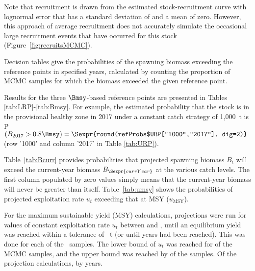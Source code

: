 Note that recruitment is drawn from the estimated stock-recruitment curve with lognormal error that has a standard deviation of  and a mean of zero. However, this approach of average recruitment does not accurately simulate the occasional large recruitment events that have occurred for this stock (Figure~\ref{fig:recruitsMCMC}).

Decision tables give the probabilities of the spawning biomass exceeding the reference points in specified years, calculated by counting the proportion of MCMC samples for which the biomass exceeded the given reference point.

Results for the three $\Bmsy$-based reference points are presented in Tables \ref{tab:LRP}-\ref{tab:Bmsy}. For example, the estimated probability that the stock is in the provisional healthy zone in 2017 under a constant catch strategy of 1,000~t is P$(B_{2017} > 0.8 \Bmsy)=\Sexpr{round(refProbs$URP["1000","2017"], dig=2)}$ (row '1000' and column '2017' in Table \ref{tab:URP}). 

Table~\ref{tab:Bcurr} provides probabilities that projected spawning biomass $B_t$ will exceed the current-year biomass $B_{\Sexpr{currYear}}$ at the various catch levels. The first column populated by zero values simply means that the current-year biomass will never be greater than itself. Table~\ref{tab:umsy} shows the probabilities of projected exploitation rate $u_t$ exceeding that at MSY ($u_\mathrm{MSY}$).

For the maximum sustainable yield (MSY) calculations, projections were run for  values of constant exploitation rate $u_t$ between  and , until an equilibrium yield was reached within a tolerance of ~t (or until  years had been reached). This was done for each of the \numMCMC~samples.
The lower bound of $u_t$ was reached for  of the MCMC samples, and the upper bound was reached by  of the samples.
Of the  projection calculations,  by  years.

